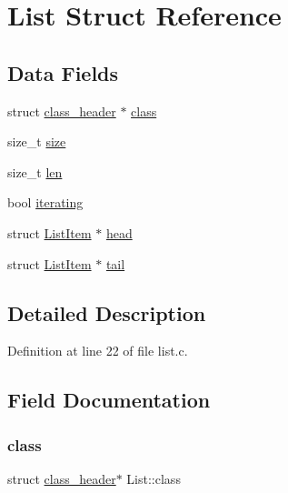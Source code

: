 \hypertarget{structList}{}\section{List Struct Reference}
\label{structList}
\subsection*{Data Fields}
\begin{DoxyCompactItemize}
\item 
struct \mbox{\hyperlink{structclass__header}{class\+\_\+header}} $\ast$ \mbox{\hyperlink{structList_a39a6fe2bfe1c66b66ca966e87241b1ca}{class}}
\item 
size\+\_\+t \mbox{\hyperlink{structList_a166530a166abd81afec0e6b0283f7e80}{size}}
\item 
size\+\_\+t \mbox{\hyperlink{structList_ac7c599366a5b35b3d8725df1b6239955}{len}}
\item 
bool \mbox{\hyperlink{structList_ac4c33942be7f3c4ae0d6d836fc9aaf25}{iterating}}
\item 
struct \mbox{\hyperlink{structListItem}{List\+Item}} $\ast$ \mbox{\hyperlink{structList_abba5cd8966cc47ab6cb0b3cead7b5106}{head}}
\item 
struct \mbox{\hyperlink{structListItem}{List\+Item}} $\ast$ \mbox{\hyperlink{structList_a6d4b5761bf36f1d143057557e034eb0b}{tail}}
\end{DoxyCompactItemize}


\subsection{Detailed Description}


Definition at line 22 of file list.\+c.



\subsection{Field Documentation}
\mbox{\label{structList_a39a6fe2bfe1c66b66ca966e87241b1ca}} 
\subsubsection{\texorpdfstring{class}{class}}
{\footnotesize\ttfamily struct \mbox{\hyperlink{structclass__header}{class\+\_\+header}}$\ast$ List\+::class}



